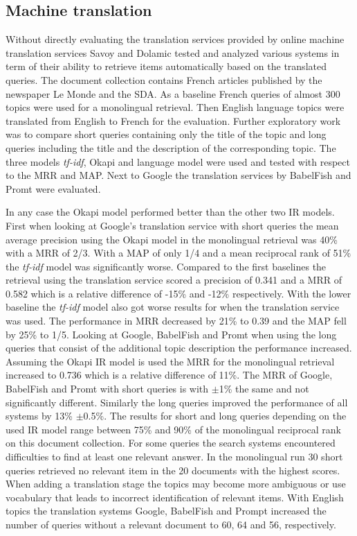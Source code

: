 \documentclass[journal]{IEEEtran}
\begin{document}
\subsection{Machine translation}
Without directly evaluating the translation services provided by online machine translation services Savoy and Dolamic \cite{savoy09} tested and analyzed various systems in term of their ability to retrieve items automatically based on the translated queries.
The document collection contains French articles published by the newspaper Le Monde and the SDA.
As a baseline French queries of almost 300 topics were used for a monolingual retrieval.
Then English language topics were translated from English to French for the evaluation.
Further exploratory work was to compare short queries containing only the title of the topic and long queries including the title and the description of the corresponding topic.
The three models \textit{tf-idf}, Okapi and language model were used and tested with respect to the MRR and MAP.
Next to Google the translation services by BabelFish and Promt were evaluated.

In any case the Okapi model performed better than the other two IR models.
First when looking at Google's translation service with short queries the mean average precision using the Okapi model in the monolingual retrieval was 40\% with a MRR of 2/3.
With a MAP of only 1/4 and a mean reciprocal rank of 51\% the \textit{tf-idf} model was significantly worse.
Compared to the first baselines the retrieval using the translation service scored a precision of 0.341 and a MRR of 0.582 which is a relative difference of -15\% and -12\% respectively.
With the lower baseline the \textit{tf-idf} model also got worse results for when the translation service was used.
The performance in MRR decreased by 21\% to 0.39 and the MAP fell by 25\% to 1/5.
Looking at Google, BabelFish and Promt when using the long queries that consist of the additional topic description the performance increased.
Assuming the Okapi IR model is used the MRR for the monolingual retrieval increased to 0.736 which is a relative difference of 11\%.
The MRR of Google, BabelFish and Promt with short queries is with $\pm$1\% the same and not significantly different.
Similarly the long queries improved the performance of all systems by 13\% $\pm$0.5\%.
The results for short and long queries depending on the used IR model range between 75\% and 90\% of the monolingual reciprocal rank on this document collection.
For some queries the search systems encountered difficulties to find at least one relevant answer.
In the monolingual run 30 short queries retrieved no relevant item in the 20 documents with the highest scores.
When adding a translation stage the topics may become more ambiguous or use vocabulary that leads to incorrect identification of relevant items.
With English topics the translation systems Google, BabelFish and Prompt increased the number of queries without a relevant document to 60, 64 and 56, respectively.
\end{document}
